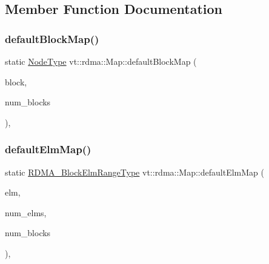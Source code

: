 \subsection{Member Function Documentation}
\mbox{\label{structvt_1_1rdma_1_1_map_a8a37b9b72187246a37d025be09e7f6c5}} 
\subsubsection{\texorpdfstring{default\+Block\+Map()}{defaultBlockMap()}}
{\footnotesize\ttfamily static \hyperlink{namespacevt_a866da9d0efc19c0a1ce79e9e492f47e2}{Node\+Type} vt\+::rdma\+::\+Map\+::default\+Block\+Map (\begin{DoxyParamCaption}\item[{\hyperlink{namespacevt_ae54d2ca8f6bb4d65faf65118c82cd6f7}{R\+D\+M\+A\+\_\+\+Block\+Type}}]{block,  }\item[{\hyperlink{namespacevt_ae54d2ca8f6bb4d65faf65118c82cd6f7}{R\+D\+M\+A\+\_\+\+Block\+Type} \+\_\+\+\_\+attribute\+\_\+\+\_\+((unused))}]{num\+\_\+blocks }\end{DoxyParamCaption})\hspace{0.3cm}{\ttfamily [inline]}, {\ttfamily [static]}}

\mbox{\label{structvt_1_1rdma_1_1_map_aebbab4065afa91396bd259001fbd4744}} 
\subsubsection{\texorpdfstring{default\+Elm\+Map()}{defaultElmMap()}}
{\footnotesize\ttfamily static \hyperlink{namespacevt_1_1rdma_a8320f97b4a2866df60d9778486dbcd0f}{R\+D\+M\+A\+\_\+\+Block\+Elm\+Range\+Type} vt\+::rdma\+::\+Map\+::default\+Elm\+Map (\begin{DoxyParamCaption}\item[{\hyperlink{namespacevt_a2c2a902092b72056f70210c159f966f0}{R\+D\+M\+A\+\_\+\+Elm\+Type}}]{elm,  }\item[{\hyperlink{namespacevt_a2c2a902092b72056f70210c159f966f0}{R\+D\+M\+A\+\_\+\+Elm\+Type}}]{num\+\_\+elms,  }\item[{\hyperlink{namespacevt_ae54d2ca8f6bb4d65faf65118c82cd6f7}{R\+D\+M\+A\+\_\+\+Block\+Type}}]{num\+\_\+blocks }\end{DoxyParamCaption})\hspace{0.3cm}{\ttfamily [inline]}, {\ttfamily [static]}}

